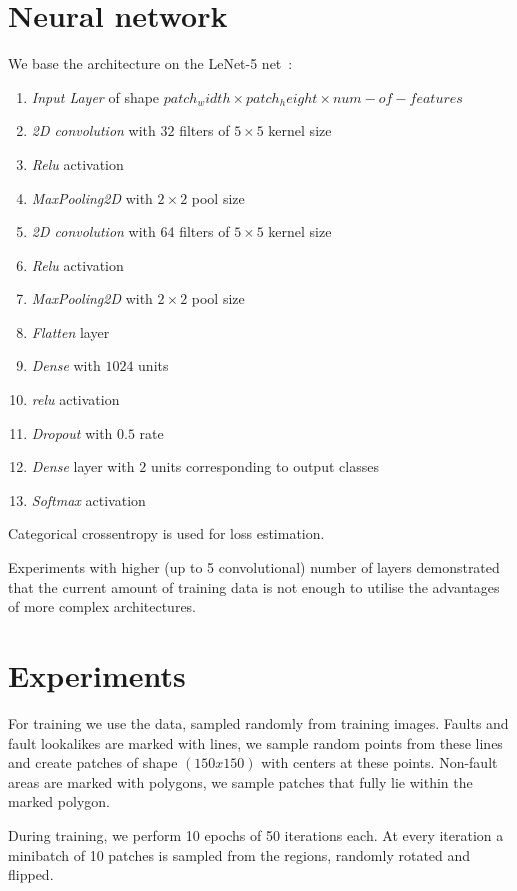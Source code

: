 \documentclass[11pt,a4paper]{article}
\begin{document}
\section{Neural network}
We base the architecture on the LeNet-5 net~\cite{lecun1998gradient}:
\begin{enumerate}
\item \textit{Input Layer} of shape $patch_width \times patch_height \times num-of-features$
\item \textit{2D convolution} with $32$ filters of $5 \times 5$ kernel size
\item \textit{Relu} activation
\item \textit{MaxPooling2D} with $2 \times 2$ pool size
\item \textit{2D convolution} with 64 filters of $5 \times 5$ kernel size
\item \textit{Relu} activation
\item \textit{MaxPooling2D} with $2 \times 2$ pool size
\item \textit{Flatten} layer
\item \textit{Dense} with $1024$ units
\item \textit{relu} activation
\item \textit{Dropout} with $0.5$ rate
\item \textit{Dense} layer with $2$ units corresponding to output classes
\item \textit{Softmax} activation
\end{enumerate}
Categorical crossentropy is used for loss estimation.

Experiments with higher (up to 5 convolutional) number of layers demonstrated that the current amount of training data
is not enough to utilise the advantages of more complex architectures.

\section{Experiments}
For training we use the data, sampled randomly from training images. Faults and fault lookalikes are marked with lines,
we sample random points from these lines and create patches of shape $(150 x 150)$ with centers at these points.
Non-fault areas are marked with polygons, we sample patches that fully lie within the marked polygon.

During training, we perform 10 epochs of 50 iterations each. At every iteration a minibatch of 10 patches is sampled
from the regions, randomly rotated and flipped.
\end{document}
